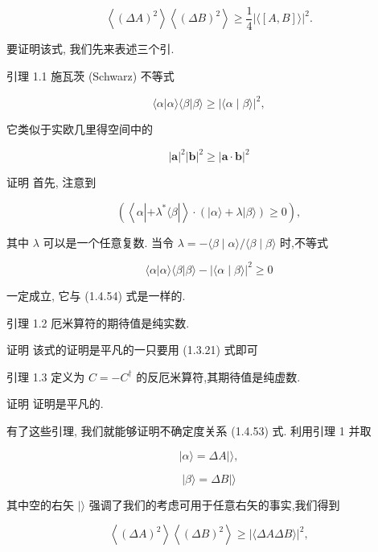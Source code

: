 \documentclass[lang=cn,newtx,10pt,scheme=chinese,thmcnt=section]{elegantbook}
\begin{document}
$$
\left\langle {\left( \Delta A\right) }^{2}\right\rangle \left\langle {\left( \Delta B\right) }^{2}\right\rangle \geq \frac{1}{4}{\left| \langle \left\lbrack A, B\right\rbrack \rangle \right| }^{2}. \tag{1. 4.53}
$$

要证明该式, 我们先来表述三个引.

引理 1.1 施瓦茨 (Schwarz) 不等式

$$
\langle \alpha \left| {\alpha \rangle \langle \beta }\right| \beta \rangle \geq {\left| \langle \alpha \mid \beta \rangle \right| }^{2}, \tag{1. 4.54}
$$

它类似于实欧几里得空间中的

$$
{\left| \mathbf{a}\right| }^{2}{\left| \mathbf{b}\right| }^{2} \geq {\left| \mathbf{a} \cdot \mathbf{b}\right| }^{2} \tag{1. 4.55}
$$

证明 首先, 注意到

$$
\left( {\left\langle {\alpha \left| {+{\lambda }^{ * }\langle \beta }\right| }\right\rangle \cdot \left( {\left| {\alpha \rangle + \lambda }\right| \beta \rangle }\right) \geq 0}\right) , \tag{1. 4.56}
$$

其中 $\lambda$ 可以是一个任意复数. 当令 $\lambda = - \langle \beta \mid \alpha \rangle /\langle \beta \mid \beta \rangle$ 时,不等式

$$
\langle \alpha \left| {\alpha \rangle \langle \beta }\right| \beta \rangle - {\left| \langle \alpha \mid \beta \rangle \right| }^{2} \geq 0 \tag{1. 4.57}
$$

一定成立, 它与 (1.4.54) 式是一样的.

引理 1.2 厄米算符的期待值是纯实数.

证明 该式的证明是平凡的一只要用 (1.3.21) 式即可

引理 1.3 定义为 $C = - {C}^{ \dagger }$ 的反厄米算符,其期待值是纯虚数.

证明 证明是平凡的.

有了这些引理, 我们就能够证明不确定度关系 (1.4.53) 式. 利用引理 1 并取

$$
\left| {\alpha \rangle = {\Delta A}}\right| \rangle ,
$$

$$
\left| {\beta \rangle = {\Delta B}}\right| \rangle \tag{1. 4.58}
$$

其中空的右矢 $|\rangle$ 强调了我们的考虑可用于任意右矢的事实,我们得到

$$
\left\langle {\left( \Delta A\right) }^{2}\right\rangle \left\langle {\left( \Delta B\right) }^{2}\right\rangle \geq {\left| \langle \Delta A\Delta B\rangle \right| }^{2}, \tag{1. 4.59}
$$
\end{document}
